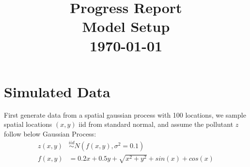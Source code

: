 \documentclass[11pt]{article}
\theoremstyle{definition}
\begin{document}

\title{Progress Report \\ Model Setup \\ \today \vspace{-1ex}}

\pretitle{\begin{flushright}\normalsize}
\posttitle{\par\end{flushright}}
\author{}
\date{}
\vspace{-10em}
\maketitle
\vspace{-5em}


\section{\textbf{Simulated Data}}
First generate data from a spatial gaussian process with 100 locations, we sample spatial locations $(x, y)$ iid from standard normal, and assume the pollutant $z$ follow below Gaussian Process:
\begin{align*}
z(x, y) &\stackrel{iid}{\sim} N(f(x, y), \sigma^2 = 0.1) \\
f(x, y) &= 0.2 x + 0.5 y + \sqrt{x^2 + y^2} + sin(x) + cos(x)
\end{align*}
\end{document}
